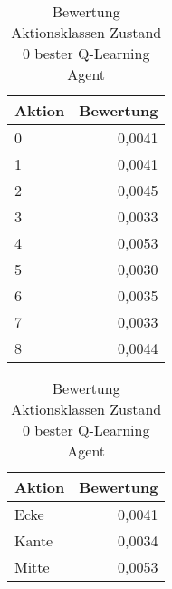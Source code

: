\begin{table}[!htb]
    \begin{minipage}[t]{.5\textwidth}
        \centering
        \caption{Bewertung Zustand 0 \\ bester Q-Learning Agent}
        \label{tab:state0_eval_ql}
        \begin{tabular}{lr}
        \toprule
        Aktion  & Bewertung \\ \midrule
        0       & 0,0041 \\
        1       & 0,0041 \\
        2		& 0,0045 \\
        3		& 0,0033 \\
        4		& 0,0053 \\
        5		& 0,0030 \\
        6		& 0,0035 \\
        7		& 0,0033 \\
        8		& 0,0044 \\ \bottomrule
    \end{tabular}
    \end{minipage}%
    \begin{minipage}[t]{.5\textwidth}
        \centering
        \caption{Bewertung Aktionsklassen Zustand 0 bester Q-Learning Agent}
        \label{tab:state0_eval_ql_aggregated}
        \begin{tabular}{lr}
        \toprule
        Aktion  & Bewertung \\ \midrule
        Ecke	& 0,0041 \\
        Kante	& 0,0034 \\
        Mitte	& 0,0053 \\ \bottomrule
        \end{tabular}
    \end{minipage}
\end{table}